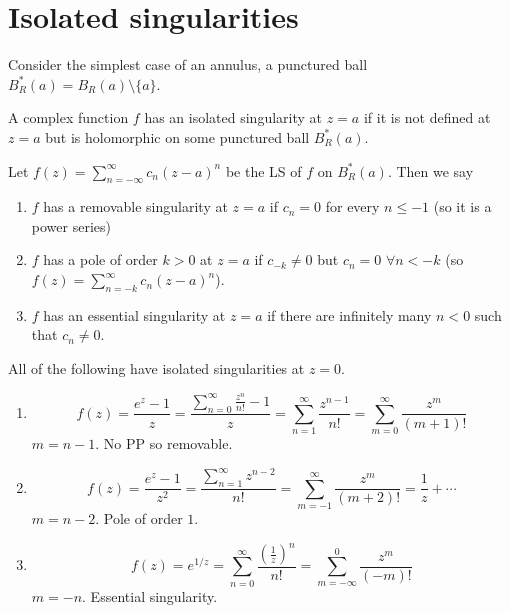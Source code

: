 \documentclass[10pt, a4paper]{article}
\begin{document}
\section{Isolated singularities}
Consider the simplest case of an annulus,
a punctured ball $B_{R}^{*}(a) = B_R(a) \setminus \{a\}$.

\begin{definition}
    A complex function $f$ has an isolated singularity at $z = a$ if it is not defined at $z = a$ but is holomorphic on some punctured ball $B_{R}^{*}(a)$.
\end{definition}
Let $f(z) = \sum_{n = -\infty}^{\infty}c_n(z - a) ^ n$ be the LS of $f$ on $B_{R}^{*}(a)$.
Then we say
\begin{enumerate}[label = (\roman*)]
    \item $f$ has a removable singularity at $z = a$ if $c_n = 0$ for every $n \leq -1$
    (so it is a power series)

    \item $f$ has a pole of order $k > 0$ at $z = a$ if $c_{-k} \neq 0$ but $c_n = 0$ $\forall n < -k$
    (so $f(z) = \sum_{n = -k}^{\infty}c_n(z - a) ^ n$).

    \item $f$ has an essential singularity at $z = a$ if there are infinitely many $n < 0$ such that $c_n \neq 0$.
\end{enumerate}

\begin{example}
    All of the following have isolated singularities at $z = 0$.

    \begin{enumerate}[label = (\roman*)]
        \item
        \[
        f(z) = \frac{e ^ z - 1}{z} = \frac{\sum_{n = 0}^{\infty}\frac{z ^ n}{n!} - 1}{z} = \sum_{n = 1}^{\infty}\frac{z ^ {n - 1}}{n!} = \sum_{m = 0}^{\infty}\frac{z ^ m}{(m + 1)!}
        \]
        $m = n - 1$.
        No $\mathrm{PP}$ so removable.

        \item
        \[
        f(z) = \frac{e ^ z - 1}{z ^ 2} = \frac{\sum_{n = 1}^{\infty}z ^ {n - 2}}{n!} = \sum_{m = -1}^{\infty}\frac{z ^ m}{(m + 2)!} = \frac{1}{z} + \dotsi
        \]
        $m = n - 2$.
        Pole of order $1$.

        \item
        \[
        f(z) = e ^ {1 / z} = \sum_{n = 0}^{\infty}\frac{\left(\frac{1}{z}\right) ^ n}{n!} = \sum_{m = -\infty}^{0}\frac{z ^ m}{(-m)!}
        \]
        $m = -n$.
        Essential singularity.
    \end{enumerate}
\end{example}
\end{document}
